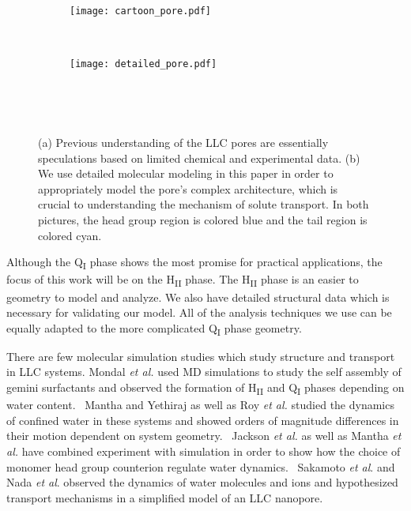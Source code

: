  \begin{figure}[!htb]
  \centering
	\begin{subfigure}{0.45\linewidth}
		\centering
		\texttt{[image: cartoon\_pore.pdf]}
		\caption{}~\label{fig:undetailed_pore}
	\end{subfigure}
	\begin{subfigure}{0.45\linewidth}
		\centering
		\texttt{[image: detailed\_pore.pdf]}
		\caption{}~\label{fig:detailed_pore}
	\end{subfigure} 
    \caption{(a) Previous understanding of the LLC pores are essentially speculations 
    based on limited chemical and experimental data. (b) We use detailed molecular 
    modeling in this paper in order to appropriately model the pore's complex architecture,
    which is crucial to understanding the mechanism of solute transport. In both 
    pictures, the head group region is colored blue and the tail region is colored cyan.}~\label{fig:detail}
  \end{figure}

  Although the Q\textsubscript{I} phase shows the most promise for practical 
  applications, the focus of this work will be on the H\textsubscript{II}
  phase. The H\textsubscript{II} phase is an easier to geometry to model
  and analyze. We also have detailed structural data which is necessary for 
  validating our model. All of the analysis techniques we use can be equally
  adapted to the more complicated Q\textsubscript{I} phase geometry.
  
  There are few molecular simulation studies which study structure and transport
  in LLC systems. Mondal \textit{et al.} used MD simulations to study the self assembly 
  of gemini surfactants and observed the formation of H\textsubscript{II} and
  Q\textsubscript{I} phases depending on water content.~\cite{mondal_self-assembly_2013}
  Mantha and Yethiraj as well as Roy \textit{et al.} studied the dynamics of confined 
  water in these systems and showed orders of magnitude differences in their motion
  dependent on system geometry.~\cite{mantha_dynamics_2016,roy_water_2016}
  Jackson \textit{et al.} as well as Mantha \textit{et al.} have combined experiment
  with simulation in order to show how the choice of monomer head group counterion 
  regulate water dynamics.~\cite{jackson_ion-specific_2018,mantha_counterion-regulated_2018}
  Sakamoto \textit{et al}. and Nada \textit{et al}. observed the dynamics of water 
  molecules and ions and hypothesized transport mechanisms in a simplified model of
  an LLC nanopore.~\cite{sakamoto_development_2018,nada_transport_2020}

